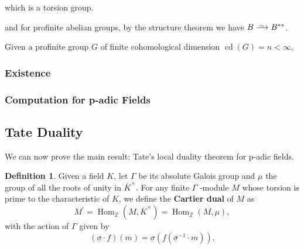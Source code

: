 \documentclass[a4paper]{article}
\def\Z{\mathbb{Z}}
\def\K{K}
\def\Kx{\overline{\K}^\times}
\DeclareMathOperator{\Hom}{Hom}
\DeclareMathOperator{\cd}{cd}
\newcommand\Iso{\xrightarrow{
   \,\smash{\raisebox{-0.65ex}{\ensuremath{\scriptstyle\sim}}}\,}}
\theoremstyle{definition}
\newtheorem{definition}[theorem]{Definition}
\theoremstyle{definition}
\theoremstyle{remark}
\begin{document}
which is a torsion group.

and for profinite abelian groups, by the structure theorem we have \(B\Iso B^{**}\).

Given a profinite group \(G\)  of finite cohomological dimension \(\cd(G)=n<\infty,\)

\subsubsection{Existence}
\subsubsection{Computation for p-adic Fields}

\subsection{Tate Duality}

We can now prove the main result: Tate's local duality theorem for p-adic fields.

\begin{definition}
    Given a field \(\K\), let  $\Gamma$ be its absolute Galois group and $\mu$ the group of all the roots of unity in $\Kx$.
    For any finite \(\Gamma\) -module \(M\) whose torsion is prime to the characteristic of \(\K\),
    we define the \textbf{Cartier dual} of $M$ as
    \begin{equation*}
        M^{\prime} = \Hom_{\Z}(M, \Kx)=\Hom_{\Z}(M, \mu),
    \end{equation*}
    with the action of $\Gamma$ given by
    \begin{equation*}
        (\sigma \cdot f)(m) = \sigma(f(\sigma^{-1}\cdot m)).
    \end{equation*}
\end{definition}
\end{document}
